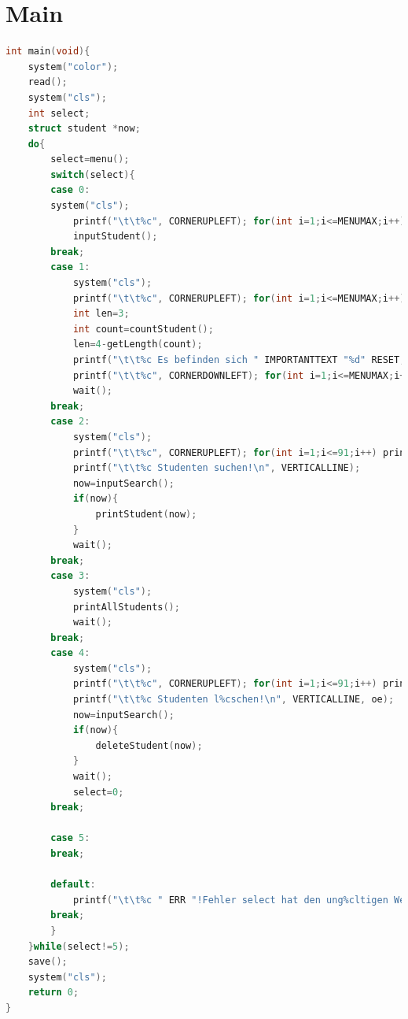 \documentclass[a4paper, 11pt, oneside]{book} %
\begin{document}
\chapter{Main}
\begin{lstlisting}[language=C]
	int main(void){
    system("color"); 
    read();
    system("cls");
    int select;
    struct student *now;
    do{
        select=menu();
        switch(select){
        case 0:
        system("cls");
            printf("\t\t%c", CORNERUPLEFT); for(int i=1;i<=MENUMAX;i++) printf("%c", HORIZONLINE); printf("%c\n", CORNERUPRIGHT);
            inputStudent();
        break;
        case 1:
            system("cls");
            printf("\t\t%c", CORNERUPLEFT); for(int i=1;i<=MENUMAX;i++) printf("%c", HORIZONLINE); printf("%c\n", CORNERUPRIGHT);
            int len=3;
            int count=countStudent();
            len=4-getLength(count);
            printf("\t\t%c Es befinden sich " IMPORTANTTEXT "%d" RESET, VERTICALLINE, count);  printf(" Eintr%cge in der Datenbank!     ", ae); for(int i=0;i<len;i++) printf(" "); printf("%c\n", VERTICALLINE);
            printf("\t\t%c", CORNERDOWNLEFT); for(int i=1;i<=MENUMAX;i++) printf("%c", HORIZONLINE); printf("%c\n", CORNERDOWNRIGHT);
            wait();
        break;
        case 2:
            system("cls");
            printf("\t\t%c", CORNERUPLEFT); for(int i=1;i<=91;i++) printf("%c", HORIZONLINE); printf("%c\n", CORNERUPRIGHT);
            printf("\t\t%c Studenten suchen!\n", VERTICALLINE); 
            now=inputSearch();
            if(now){
                printStudent(now);
            }
            wait();
        break;
        case 3:
            system("cls");
            printAllStudents();
            wait();
        break;
        case 4:
            system("cls");
            printf("\t\t%c", CORNERUPLEFT); for(int i=1;i<=91;i++) printf("%c", HORIZONLINE); printf("%c\n", CORNERUPRIGHT);
            printf("\t\t%c Studenten l%cschen!\n", VERTICALLINE, oe); 
            now=inputSearch();
            if(now){
                deleteStudent(now);
            }
            wait();
            select=0;
        break;
        
        case 5:
        break;
        
        default:
            printf("\t\t%c " ERR "!Fehler select hat den ung%cltigen Wert '%d'!\n" RESET, VERTICALLINE, ue, select);
        break;
        }
    }while(select!=5);
    save();
    system("cls");
    return 0;
}
\end{lstlisting}
\end{document}
